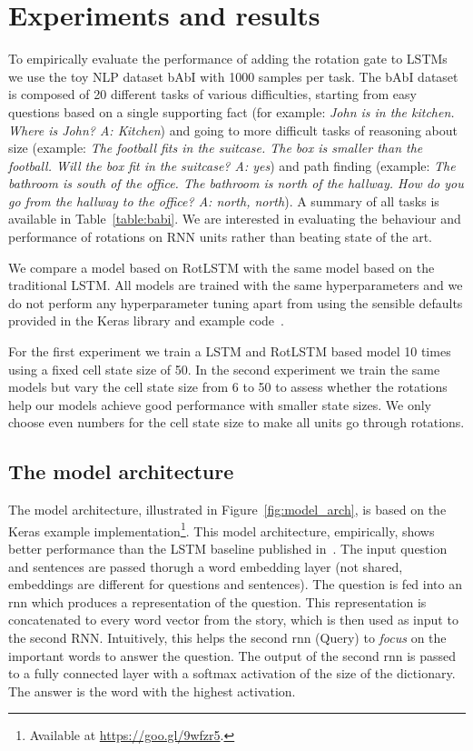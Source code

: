 \documentclass{article}
\begin{document}
\section{Experiments and results}

To empirically evaluate the performance of adding the rotation gate to \acp{LSTM} we use the toy \ac{NLP} dataset bAbI with 1000 samples per task. The bAbI dataset is composed of 20 different tasks of various difficulties, starting from easy questions based on a single supporting fact (for example: \emph{John is in the kitchen. Where is John? A: Kitchen}) and going to more difficult tasks of reasoning about size (example: \emph{The football fits in the suitcase. The box is smaller than the football. Will the box fit in the suitcase? A: yes}) and path finding (example: \emph{The bathroom is south of the office. The bathroom is north of the hallway. How do you go from the hallway to the office?	A: north, north}). A summary of all tasks is available in Table~\ref{table:babi}. We are interested in evaluating the behaviour and performance of rotations on RNN units rather than beating state of the art.



We compare a model based on RotLSTM with the same model based on the traditional LSTM. All models are trained with the same hyperparameters and we do not perform any hyperparameter tuning apart from using the sensible defaults provided in the Keras library and example code~\citep{chollet2015keras}.

For the first experiment we train a LSTM and RotLSTM based model 10 times using a fixed cell state size of 50. In the second experiment we train the same models but vary the cell state size from 6 to 50 to assess whether the rotations help our models achieve good performance with smaller state sizes. We only choose even numbers for the cell state size to make all units go through rotations.

\subsection{The model architecture}

The model architecture, illustrated in Figure~\ref{fig:model_arch}, is based on the Keras example implementation\footnote{Available at \url{https://goo.gl/9wfzr5}.}. This model architecture, empirically, shows better performance than the \ac{LSTM} baseline published in~\cite{DBLP:journals/corr/WestonBCM15}. The input question and sentences are passed thorugh a word embedding layer (not shared, embeddings are different for questions and sentences). The question is fed into an \ac{rnn} which produces a representation of the question. This representation is concatenated to every word vector from the story, which is then used as input to the second RNN. Intuitively, this helps the second \ac{rnn} (Query) to \emph{focus} on the important words to answer the question. The output of the second \ac{rnn} is passed to a fully connected layer with a softmax activation of the size of the dictionary. The answer is the word with the highest activation.
\end{document}
